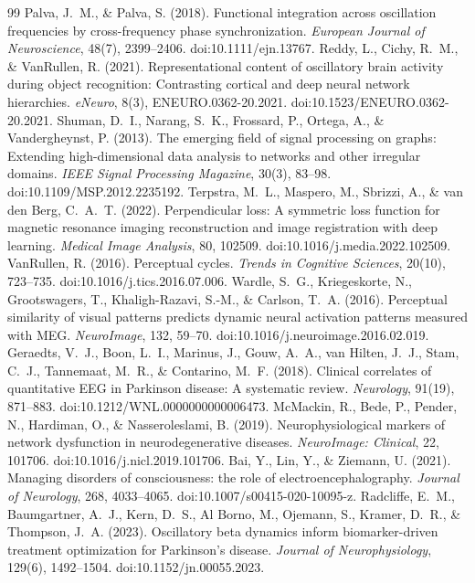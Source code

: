 \documentclass[11pt]{article}
\begin{document}
\begin{thebibliography}{99}
 Palva, J.~M., \& Palva, S. (2018). Functional integration across oscillation frequencies by cross-frequency phase synchronization. \emph{European Journal of Neuroscience}, 48(7), 2399--2406. doi:10.1111/ejn.13767.
 Reddy, L., Cichy, R.~M., \& VanRullen, R. (2021). Representational content of oscillatory brain activity during object recognition: Contrasting cortical and deep neural network hierarchies. \emph{eNeuro}, 8(3), ENEURO.0362-20.2021. doi:10.1523/ENEURO.0362-20.2021.
 Shuman, D.~I., Narang, S.~K., Frossard, P., Ortega, A., \& Vandergheynst, P. (2013). The emerging field of signal processing on graphs: Extending high-dimensional data analysis to networks and other irregular domains. \emph{IEEE Signal Processing Magazine}, 30(3), 83--98. doi:10.1109/MSP.2012.2235192.
 Terpstra, M.~L., Maspero, M., Sbrizzi, A., \& van den Berg, C.~A.~T. (2022). Perpendicular loss: A symmetric loss function for magnetic resonance imaging reconstruction and image registration with deep learning. \emph{Medical Image Analysis}, 80, 102509. doi:10.1016/j.media.2022.102509.
 VanRullen, R. (2016). Perceptual cycles. \emph{Trends in Cognitive Sciences}, 20(10), 723--735. doi:10.1016/j.tics.2016.07.006.
 Wardle, S.~G., Kriegeskorte, N., Grootswagers, T., Khaligh-Razavi, S.-M., \& Carlson, T.~A. (2016). Perceptual similarity of visual patterns predicts dynamic neural activation patterns measured with MEG. \emph{NeuroImage}, 132, 59--70. doi:10.1016/j.neuroimage.2016.02.019.
 Geraedts, V.~J., Boon, L.~I., Marinus, J., Gouw, A.~A., van Hilten, J.~J., Stam, C.~J., Tannemaat, M.~R., \& Contarino, M.~F. (2018). Clinical correlates of quantitative EEG in Parkinson disease: A systematic review. \emph{Neurology}, 91(19), 871--883. doi:10.1212/WNL.0000000000006473.
 McMackin, R., Bede, P., Pender, N., Hardiman, O., \& Nasseroleslami, B. (2019). Neurophysiological markers of network dysfunction in neurodegenerative diseases. \emph{NeuroImage: Clinical}, 22, 101706. doi:10.1016/j.nicl.2019.101706.
 Bai, Y., Lin, Y., \& Ziemann, U. (2021). Managing disorders of consciousness: the role of electroencephalography. \emph{Journal of Neurology}, 268, 4033--4065. doi:10.1007/s00415-020-10095-z.
 Radcliffe, E.~M., Baumgartner, A.~J., Kern, D.~S., Al Borno, M., Ojemann, S., Kramer, D.~R., \& Thompson, J.~A. (2023). Oscillatory beta dynamics inform biomarker-driven treatment optimization for Parkinson's disease. \emph{Journal of Neurophysiology}, 129(6), 1492--1504. doi:10.1152/jn.00055.2023.
\end{thebibliography}
\end{document}
